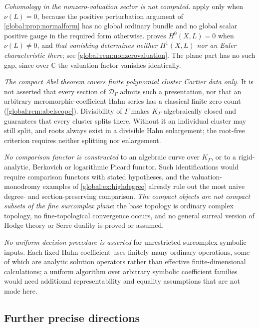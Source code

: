 \documentclass[11pt,letterpaper]{article}
\theoremstyle{definition}
\theoremstyle{remark}
\newcommand{\C}{\mathbb C}
\newcommand{\KK}{K_\Gamma}
\newcommand{\DG}{\mathscr D_\Gamma}
\numberwithin{equation}{section}
\begin{document}
\emph{Cohomology in the nonzero-valuation sector is not computed.}  apply only when $\nu(L)=0$, because the positive perturbation argument of \cref{global:prop:normalform} has no global ordinary bundle and no global scalar positive gauge in the required form otherwise.  proves $H^0(X,L)=0$ when $\nu(L)\ne0$, and \emph{that vanishing determines neither $H^1(X,L)$ nor an Euler characteristic there}; see \cref{global:rem:nonzerovaluation}. The plane part has no such gap, since over $\C$ the valuation factor vanishes identically.

\emph{The compact Abel theorem covers finite polynomial cluster Cartier data only.} It is not asserted that every section of $\DG$ admits such a presentation, nor that an arbitrary meromorphic-coefficient Hahn series has a classical finite zero count (\cref{global:rem:abelscope}). Divisibility of $\Gamma$ makes $\KK$ algebraically closed and guarantees that every cluster splits there. Without it an individual cluster may still split, and roots always exist in a divisible Hahn enlargement; the root-free criterion requires neither splitting nor enlargement.

\emph{No comparison functor is constructed} to an algebraic curve over $\KK$, or to a rigid-analytic, Berkovich or logarithmic Picard functor. Such identifications would require comparison functors with stated hypotheses, and the valuation-monodromy examples of \cref{global:ex:highdegree} already rule out the most naive degree- and section-preserving comparison. \emph{The compact objects are not compact subsets of the fine surcomplex plane}: the base topology is ordinary complex topology, no fine-topological convergence occurs, and no general surreal version of Hodge theory or Serre duality is proved or assumed.

\emph{No uniform decision procedure is asserted} for unrestricted surcomplex symbolic inputs. Each fixed Hahn coefficient uses finitely many ordinary operations, some of which are analytic solution operators rather than effective finite-dimensional calculations; a uniform algorithm over arbitrary symbolic coefficient families would need additional representability and equality assumptions that are not made here.

\subsection{Further precise directions}
\end{document}

